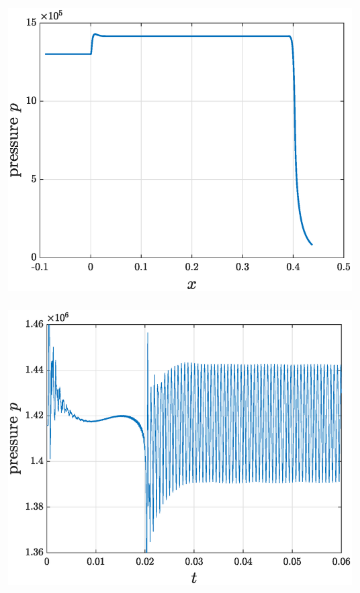\begin{figure}[t]
\centering
\begin{subfigure}[]{0.47\linewidth}
	\includegraphics[width=\textwidth]{./pic/init_pressure}
	\caption{} \label{fig:5p2.2a}
\end{subfigure}
\begin{subfigure}[]{0.47\linewidth}
	\includegraphics[width=\textwidth]{./pic/init_osc}
	\caption{} \label{fig:5p2.2b}
\end{subfigure} \\
\begin{subfigure}[]{0.47\linewidth}

\end{subfigure}
\end{figure}
